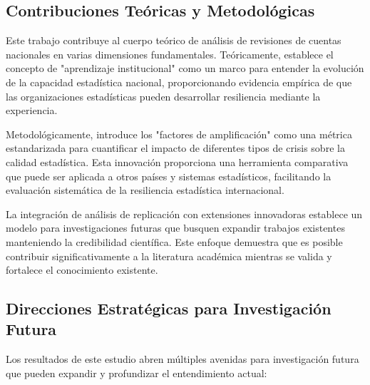 \documentclass[12pt,a4paper]{article}
\begin{document}
\subsection{Contribuciones Teóricas y Metodológicas}

Este trabajo contribuye al cuerpo teórico de análisis de revisiones de cuentas nacionales en varias dimensiones fundamentales. Teóricamente, establece el concepto de "aprendizaje institucional" como un marco para entender la evolución de la capacidad estadística nacional, proporcionando evidencia empírica de que las organizaciones estadísticas pueden desarrollar resiliencia mediante la experiencia.

Metodológicamente, introduce los "factores de amplificación" como una métrica estandarizada para cuantificar el impacto de diferentes tipos de crisis sobre la calidad estadística. Esta innovación proporciona una herramienta comparativa que puede ser aplicada a otros países y sistemas estadísticos, facilitando la evaluación sistemática de la resiliencia estadística internacional.

La integración de análisis de replicación con extensiones innovadoras establece un modelo para investigaciones futuras que busquen expandir trabajos existentes manteniendo la credibilidad científica. Este enfoque demuestra que es posible contribuir significativamente a la literatura académica mientras se valida y fortalece el conocimiento existente.

\subsection{Direcciones Estratégicas para Investigación Futura}

Los resultados de este estudio abren múltiples avenidas para investigación futura que pueden expandir y profundizar el entendimiento actual:
\end{document}
